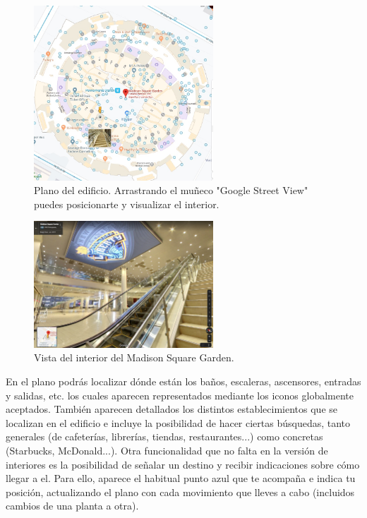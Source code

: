 \documentclass{article}
\begin{document}
		 \begin{figure}[h!]
			\centering
			\includegraphics[width=0.6\textwidth]{MadSq2}
			\caption{Plano del edificio. Arrastrando el muñeco "Google Street View" puedes posicionarte y visualizar el interior.}
			\label{fig:ejemplo}
		\end{figure}
		
		 \begin{figure}[h!]
			\centering
			\includegraphics[width=0.6\textwidth]{MadSq3}
			\caption{Vista del interior del Madison Square Garden. }
			\label{fig:ejemplo}
		\end{figure}
	    
		En el plano podrás localizar dónde están los baños, escaleras, ascensores, entradas y salidas, etc. los cuales aparecen representados mediante los iconos globalmente aceptados. También aparecen detallados los distintos establecimientos que se localizan en el edificio e incluye la posibilidad de hacer ciertas búsquedas, tanto generales (de cafeterías, librerías, tiendas, restaurantes...) como concretas (Starbucks, McDonald...). Otra funcionalidad que no falta en la versión de interiores es la posibilidad de señalar un destino y recibir indicaciones sobre cómo llegar a el. Para ello, aparece el habitual punto azul que te acompaña e indica tu posición, actualizando el plano con cada movimiento que lleves a cabo (incluidos cambios de una planta a otra).
		
\end{document}
